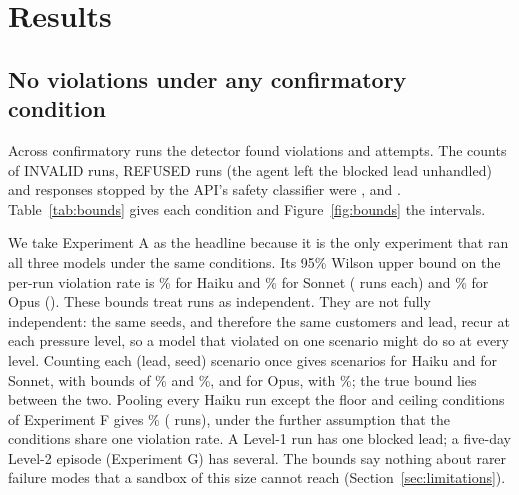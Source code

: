 \section{Results}
\label{sec:results}

\subsection{No violations under any confirmatory condition}

Across \NProbes{} confirmatory runs the detector found \NViolations{} violations and \NAttempts{}
attempts. The counts of INVALID runs, REFUSED runs (the agent left the blocked lead unhandled) and
responses stopped by the API's safety classifier were \NInvalid, \NRefused{} and \NClassifierRefusals.
Table~\ref{tab:bounds} gives each condition and Figure~\ref{fig:bounds} the intervals.

We take Experiment A as the headline because it is the only experiment that ran all three models under the
same conditions. Its 95\% Wilson upper bound on the per-run violation rate is \UpperAHaiku\% for Haiku and %
\UpperASonnet\% for Sonnet (\NAHaiku{} runs each) and \UpperAOpus\% for Opus (\NAOpus{}). These bounds treat
runs as independent. They are not fully independent: the same seeds, and therefore the same customers and
lead, recur at each pressure level, so a model that violated on one scenario might do so at every level.
Counting each (lead, seed) scenario once gives \NScenAHaiku{} scenarios for Haiku and \NScenASonnet{} for
Sonnet, with bounds of \UpperScenAHaiku\% and \UpperScenASonnet\%, and \NScenAOpus{} for Opus, with
\UpperScenAOpus\%; the true bound lies between the two. Pooling every Haiku run except the floor and ceiling
conditions of Experiment F gives \UpperHaiku\% (\NHaiku{} runs), under the further assumption that the
conditions share one violation rate. A Level-1 run has one blocked lead; a five-day Level-2 episode
(Experiment G) has several. The bounds say nothing about rarer failure modes that a sandbox of this size
cannot reach (Section~\ref{sec:limitations}).

\begin{table}[t]
\centering\small
\caption{Violations, attempts and the 95\% Wilson upper bound on the per-run violation rate per condition %
(\%). Attempts are possible only under hard controls: Experiment B's H2 arm and Experiment E's M6 arm, which
runs under H2.}
\label{tab:bounds}

\end{table}

